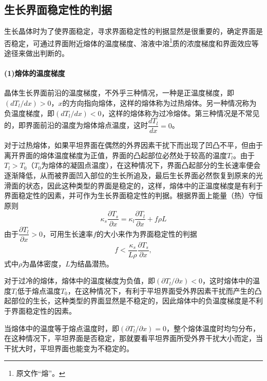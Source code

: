 \subsection{生长界面稳定性的判据}
生长晶体时为了使界面稳定，寻求界面稳定性的判据显然是很重要的，确定界面是否稳定，可通过界面附近熔体的温度梯度、溶液中溶\footnote{原文作“熔”。}质的浓度梯度和界面效应等途径来做出判断的。

\paragraph{(1)熔体的温度梯度}晶体生长界面前沿的温度梯度，不外乎三种情况，一种是正温度梯度，即$(dT_l/dx)>0$，$x$的方向指向熔体，这样的熔体称为过热熔体。另一种情况称为负温度梯度，即$(dT_l/dx)<0$，这样的熔体称为过冷熔体。第三种情况是不常见的，即界面前沿的温度为熔体熔点温度，这时$\dfrac{dT_l}{dx}=0$。

对于过热熔体，如果平坦界面在偶然的外界因素干扰下而出现了凹凸不平，但由于离开界面的熔体温度梯度为正值，界面的凸起部位必然处于较高的温度$T_l$。由于$T_l>T_0$（$T_0$为熔体的凝固点温度），在这种情况下，界面凸起部分的生长速率便会逐渐降低，从而被界面凹入部位的生长所追及，最后生长界面必然恢复到原来的光滑面的状态，因此这种类型的界面是稳定的，这样，熔体中的正温度梯度是有利于界面稳定性的因素，并可作为生长界面稳定性的判据。根据界面上能量（热）守恒原则
$$\kappa_s\frac{\partial T_s}{\partial x}=\kappa_l\frac{\partial T_l}{\partial x}+f\rho L$$
由于$\dfrac{\partial T_l}{\partial x}>0$，可用生长速率$f$的大小来作为界面稳定性的判据
\begin{equation}
f<\frac{\kappa_s}{L\rho}\frac{\partial T_s}{\partial x},
\end{equation}
式中$\rho$为晶体密度，$L$为结晶潜热。

对于过冷的熔体，熔体中的温度梯度为负值，即$(\partial T_l/\partial x)<0$，这时熔体中的温度$T_l$低于熔点温度$T_0$，在这种情况下，有利于平坦界面受外界因素干扰而产生的凸起部位的生长，这种类型的界面显然是不稳定的，因此熔体中的负温度梯度是不利于界面稳定性的因素。

当熔体中的温度等于熔点温度时，即$(\partial T_l/\partial x)=0$，整个熔体温度时均匀分布，在这种情况下，平坦界面是否稳定，那就要看平坦界面所受外界干扰大小而定，当干扰大时，平坦界面也能变为不稳定的。

